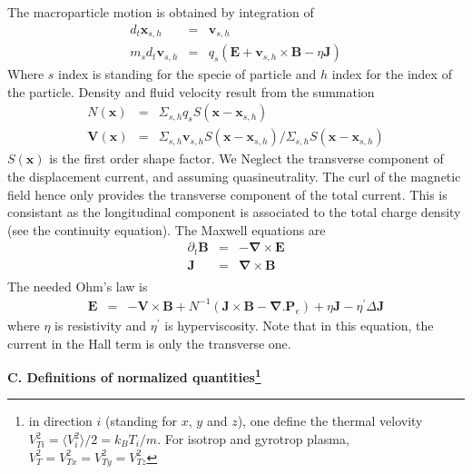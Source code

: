 \documentclass[a4paper,11pt]{letter}
\begin{document}
The macroparticle motion is obtained by integration of
\begin{eqnarray*}
d_t \mathbf x_{s,h} & = & \mathbf v_{s,h} \\
m_s d_t \mathbf v_{s,h} & = & q_s (\mathbf E + \mathbf v_{s,h} \times \mathbf B - \eta \mathbf J)
\end{eqnarray*}
Where $s$ index is standing for the specie of particle and $h$ index for the index of the particle. Density and fluid velocity result from the summation
\begin{eqnarray*}
N (\mathbf x) & = & \Sigma_{s,h} q_s S(\mathbf x - \mathbf x_{s,h}) \\
\mathbf V (\mathbf x) & = & \Sigma_{s,h} \mathbf v_{s,h} S(\mathbf x - \mathbf x_{s,h}) / \Sigma_{s,h} S(\mathbf x - \mathbf x_{s,h})
\end{eqnarray*}
$S(\mathbf x)$ is the first order shape factor. We Neglect the transverse component of the displacement current, and assuming quasineutrality. The curl of the magnetic field hence only provides the transverse component of the total current. This is consistant as the longitudinal component is associated to the total charge density (see the continuity equation). The Maxwell equations  are
\begin{eqnarray*}
\partial_t \mathbf B & = & - \boldsymbol{\nabla} \times \mathbf E\\
\mathbf J & = & \boldsymbol{\nabla} \times \mathbf B\\
\end{eqnarray*}
The needed Ohm's law is
\begin{eqnarray*}
{\mathbf E} & = & -{\mathbf V} \times {\mathbf B} + N^{-1}({\mathbf J} \times {\mathbf B} - \boldsymbol{\nabla} . {\mathbf P}_e) + \eta {\mathbf J} - \eta^{\prime} \Delta {\mathbf J}
\end{eqnarray*}
where $\eta$ is resistivity and $\eta^{\prime}$ is hyperviscosity. Note that in this equation, the current in the Hall term is only the transverse one.

\newpage

{\bf C. Definitions of normalized quantities\footnote{in direction $i$ (standing for $x$, $y$ and $z$), one define the thermal velovity $V_{Ti}^2 = \langle V_i^2 \rangle/2 = k_B T_i / m$. For isotrop and gyrotrop plasma, $V_{T}^2 = V_{Tx}^2 = V_{Ty}^2 = V_{Tz}^2$}}
\end{document}
